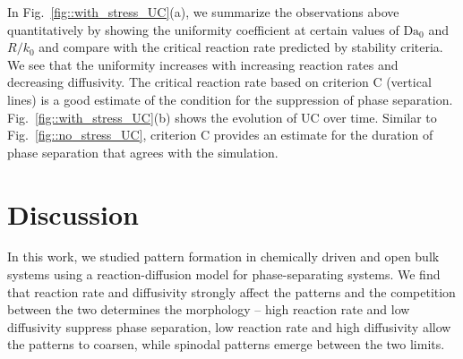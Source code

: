 \documentclass[reprint,aps,pre,superscriptaddress]{revtex4-2}
\let\originalleft\left
\let\originalright\right
\renewcommand{\left}{\mathopen{}\mathclose\bgroup\originalleft}
\renewcommand{\right}{\aftergroup\egroup\originalright}
\begin{document}


In Fig.~\ref{fig::with_stress_UC}(a), we summarize the observations above quantitatively by showing the uniformity coefficient at certain values of $\text{Da}_0$ and $R/k_0$ and compare with the critical reaction rate predicted by stability criteria. We see that the uniformity increases with increasing reaction rates and decreasing diffusivity. The critical reaction rate based on criterion C (vertical lines) is a good estimate of the condition for the suppression of phase separation. Fig.~\ref{fig::with_stress_UC}(b) shows the evolution of UC over time. Similar to Fig.~\ref{fig::no_stress_UC}, criterion C provides an estimate for the duration of phase separation that agrees with the simulation.


\section{Discussion}
In this work, we studied pattern formation in chemically driven and open bulk systems using a reaction-diffusion model for phase-separating systems. We find that reaction rate and diffusivity strongly affect the patterns and the competition between the two determines the morphology -- high reaction rate and low diffusivity suppress phase separation, low reaction rate and high diffusivity allow the patterns to coarsen, while spinodal patterns emerge between the two limits.
\end{document}

